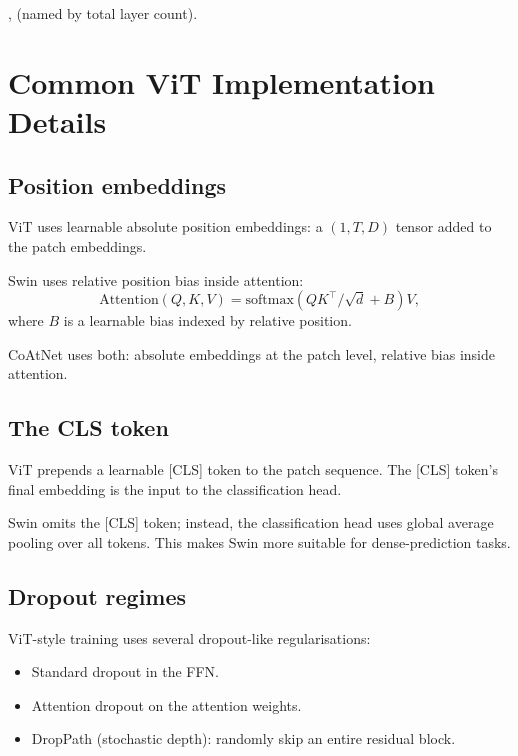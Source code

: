 ,  (named by total layer count).

\section{Common ViT Implementation Details}
\label{sec:vision_transformers:common_details}

\subsection{Position embeddings}
\label{ssec:vision_transformers:pos_embed}

ViT uses learnable absolute position embeddings: a $(1, T, D)$
tensor added to the patch embeddings.

Swin uses relative position bias inside attention:
\[
\mathrm{Attention}(Q, K, V) = \mathrm{softmax}(QK^\top/\sqrt{d} + B) V,
\]
where $B$ is a learnable bias indexed by relative position.

CoAtNet uses both: absolute embeddings at the patch level,
relative bias inside attention.

\subsection{The CLS token}
\label{ssec:vision_transformers:cls_token}

ViT prepends a learnable [CLS] token to the patch sequence. The
[CLS] token's final embedding is the input to the classification
head.

Swin omits the [CLS] token; instead, the classification head
uses global average pooling over all tokens. This makes Swin
more suitable for dense-prediction tasks.

\subsection{Dropout regimes}
\label{ssec:vision_transformers:dropout}

ViT-style training uses several dropout-like regularisations:
\begin{itemize}
  \item Standard dropout in the FFN.
  \item Attention dropout on the attention weights.
  \item DropPath (stochastic depth): randomly skip an entire
    residual block.
\end{itemize}

